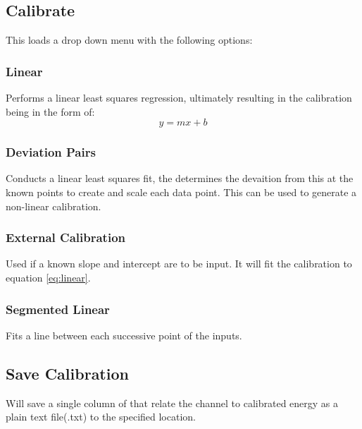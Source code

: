 	\subsection{Calibrate}
		This loads a drop down menu with the following options:
				\subsubsection{Linear}
				Performs a linear least squares regression, ultimately resulting in the calibration being in the form of:
				\begin{equation}
				 	y=mx+b
				\label{eq:linear}
				\end{equation}
				\subsubsection{Deviation Pairs}
				Conducts a linear least squares fit, the determines the devaition from this at the known points to create and scale each data point. This can be used to generate a non-linear calibration.
				\subsubsection{External Calibration}
				Used if a known slope and intercept are to be input. It will fit the calibration to equation \ref{eq:linear}.
				\subsubsection{Segmented Linear}
				Fits a line between each successive point of the inputs.
	\subsection{Save Calibration}
	Will save a single column of that relate the channel to calibrated energy as a plain text file(.txt) to the specified location.